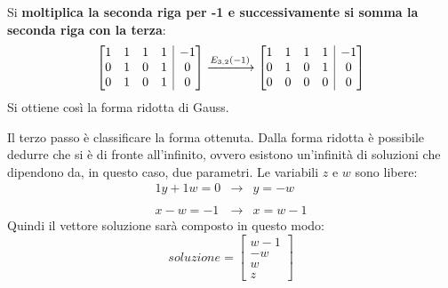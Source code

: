 \documentclass[a4paper]{article}
\makeatletter
\newenvironment{rowequmatbra}[1]{\left[\array{@{}#1@{}}}{\endarray\right]}
\makeatother
\begin{document}
	Si \textbf{moltiplica la seconda riga per -1 e successivamente si somma la seconda riga con la terza}:
	\begin{equation*}
		\begin{rowequmatbra}{cccc|c}
			1  &  1 &  1 &  1 & -1 	\\
			0  &  1 &  0 &  1 &  0	\\
			0  &  1 &  0 &  1 &  0
		\end{rowequmatbra} \xlongrightarrow{E_{3,2}\left(-1\right)}
		\begin{rowequmatbra}{cccc|c}
			1  &  1 &  1 &  1 & -1 	\\
			0  &  1 &  0 &  1 &  0	\\
			0  &  0 &  0 &  0 &  0
		\end{rowequmatbra}
	\end{equation*}
	Si ottiene così la forma ridotta di Gauss.\newline
	
	\noindent
	Il \textcolor{Red3}{terzo passo} è classificare la forma ottenuta. Dalla forma ridotta è possibile dedurre che si è di fronte all'infinito, ovvero esistono un'infinità di soluzioni che dipendono da, in questo caso, due parametri. Le variabili $z$ e $w$ sono libere:
	\begin{equation*}
		\begin{array}{rll}
			1y + 1w = 0 & \longrightarrow & y = -w \\
			\\
			x - w = -1 & \longrightarrow & x = w - 1
		\end{array}
	\end{equation*}
	Quindi il vettore soluzione sarà composto in questo modo:
	\begin{equation*}
		soluzione = \begin{bmatrix}
			w-1 \\
			-w 	\\
			w	\\
			z
		\end{bmatrix}
	\end{equation*}
\end{document}
